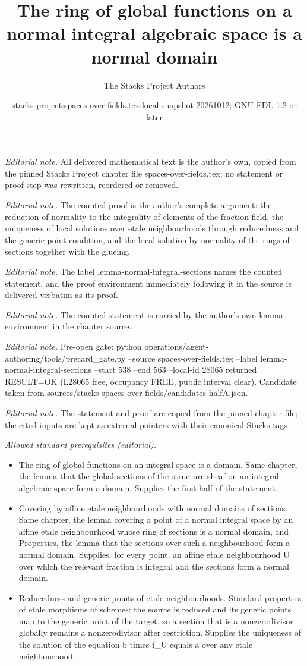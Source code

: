 \documentclass[10pt,a4paper]{amsart}
\title{The ring of global functions on a normal integral algebraic space is a normal domain}
\author{The Stacks Project Authors}
\date{stacks-project:spaces-over-fields.tex:local-snapshot-20261012; GNU FDL 1.2 or later}
\theoremstyle{plain}
\theoremstyle{definition}
\theoremstyle{remark}
\numberwithin{equation}{subsection}
\begin{document}
\maketitle
\noindent\textit{Editorial note.} All delivered mathematical text is the author's own, copied from the pinned Stacks Project chapter file spaces-over-fields.tex; no statement or proof step was rewritten, reordered or removed.\par\medskip
\noindent\textit{Editorial note.} The counted proof is the author's complete argument: the reduction of normality to the integrality of elements of the fraction field, the uniqueness of local solutions over etale neighbourhoods through reducedness and the generic point condition, and the local solution by normality of the rings of sections together with the glueing.\par\medskip
\noindent\textit{Editorial note.} The label lemma-normal-integral-sections names the counted statement, and the proof environment immediately following it in the source is delivered verbatim as its proof.\par\medskip
\noindent\textit{Editorial note.} The counted statement is carried by the author's own lemma environment in the chapter source.\par\medskip
\noindent\textit{Editorial note.} Pre-open gate: python operations/agent-authoring/tools/precard\_gate.py --source spaces-over-fields.tex --label lemma-normal-integral-sections --start 538 --end 563 --local-id 28065 returned RESULT=OK (L28065 free, occupancy FREE, public interval clear). Candidate taken from sources/stacks-spaces-over-fields/candidates-halfA.json.\par\medskip
\noindent\textit{Editorial note.} The statement and proof are copied from the pinned chapter file; the cited inputs are kept as external pointers with their canonical Stacks tags.\par\medskip
\noindent\textit{Allowed standard prerequisites (editorial).}\begin{itemize}
\item The ring of global functions on an integral space is a domain. Same chapter, the lemma that the global sections of the structure sheaf on an integral algebraic space form a domain. Supplies the first half of the statement.
\item Covering by affine etale neighbourhoods with normal domains of sections. Same chapter, the lemma covering a point of a normal integral space by an affine etale neighbourhood whose ring of sections is a normal domain, and Properties, the lemma that the sections over such a neighbourhood form a normal domain. Supplies, for every point, an affine etale neighbourhood U over which the relevant fraction is integral and the sections form a normal domain.
\item Reducedness and generic points of etale neighbourhoods. Standard properties of etale morphisms of schemes: the source is reduced and its generic points map to the generic point of the target, so a section that is a nonzerodivisor globally remains a nonzerodivisor after restriction. Supplies the uniqueness of the solution of the equation b times f\_U equals a over any etale neighbourhood.
\end{itemize}\medskip
\end{document}

